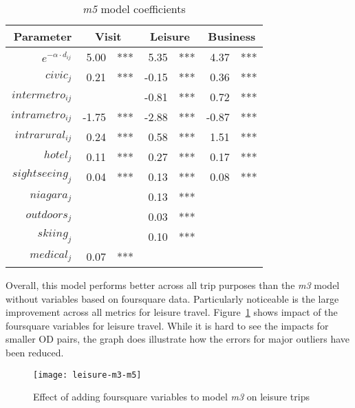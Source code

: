 \begin{table}[H]
\centering
\caption{\textit{m5} model coefficients}
\label{table:m5-coeff}
\begin{tabular}{@{}rrlrlrl@{}}
  \toprule
 Parameter & \multicolumn{2}{c}{Visit} & \multicolumn{2}{c}{Leisure} & \multicolumn{2}{c}{Business} \\ \midrule
  $e^{-\alpha \cdot d_{ij}}$ & 5.00 & *** & 5.35 & *** & 4.37 & *** \\ 
  $civic_j$ & 0.21 & *** & -0.15 & *** & 0.36 & *** \\ 
  $intermetro_{ij}$ &  &  & -0.81 & *** & 0.72 & *** \\ 
  $intrametro_{ij}$  & -1.75 & *** & -2.88 & *** & -0.87 & *** \\   
  $intrarural_{ij}$  & 0.24 & *** & 0.58 & *** & 1.51 & *** \\ 
  $hotel_j$ & 0.11 & *** & 0.27 & *** & 0.17 & *** \\ 
  $sightseeing_j$  & 0.04 & *** & 0.13 & *** & 0.08 & *** \\ 
  $niagara_j$&  &  & 0.13 & *** &  &  \\ 
  $outdoors_j$ &  &  & 0.03 & *** &  &  \\ 
  $skiing_j$ &  &  & 0.10 & *** &  &  \\ 
  $medical_j$  & 0.07 & *** &  &  &  &  \\ 
   \bottomrule
\end{tabular}
\end{table}

Overall, this model performs better across all trip purposes than the \textit{m3} model without variables based on foursquare data. Particularly noticeable is the large improvement across all metrics for leisure travel. Figure~\ref{fig:leisure-m3-m5} shows impact of the foursquare variables for leisure travel. While it is hard to see the impacts for smaller OD pairs, the graph does illustrate how the errors for major outliers have been reduced. 

\begin{figure}[H]
\centering
\texttt{[image: leisure-m3-m5]}
\caption{Effect of adding foursquare variables to model \textit{m3} on leisure trips}
\label{fig:leisure-m3-m5}
\end{figure}


